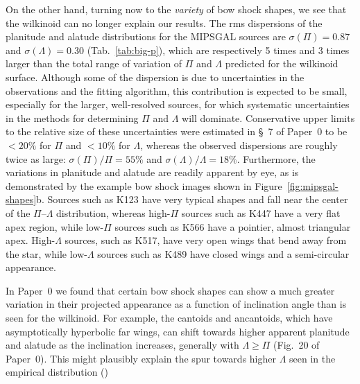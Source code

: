 On the other hand, turning now to the \emph{variety} of bow shock
shapes, we see that the wilkinoid can no longer explain our results.
The rms dispersions of the planitude and alatude distributions for the
MIPSGAL sources are \(\sigma(\Pi) = 0.87\) and
\(\sigma(\Lambda) = 0.30\) (Tab.~\ref{tab:big-p}), which are respectively 5 times
and 3 times larger than the total range of variation of \(\Pi\) and
\(\Lambda\) predicted for the wilkinoid surface.  Although some of the
dispersion is due to uncertainties in the observations and the fitting
algorithm, this contribution is expected to be small, especially for
the larger, well-resolved sources, for which systematic uncertainties
in the methods for determining \(\Pi\) and \(\Lambda\) will
dominate. Conservative upper limits to the relative size of these
uncertainties were estimated in \S~7 of Paper~0 to be \(< 20\%\) for
\(\Pi\) and \(< 10\%\) for \(\Lambda\), whereas the observed dispersions are
roughly twice as large: \(\sigma(\Pi)/\Pi = 55\%\) and
\(\sigma(\Lambda)/\Lambda = 18\%\).  Furthermore, the variations in planitude and
alatude are readily apparent by eye, as is demonstrated by the example
bow shock images shown in Figure~\ref{fig:mipsgal-shapes}b.  Sources
such as K123 have very typical shapes and fall near the center of the
\(\Pi\)--\(\Lambda\) distribution, whereas high-\(\Pi\) sources such as K447 have
a very flat apex region, while low-\(\Pi\) sources such as K566 have a
pointier, almost triangular apex.  High-\(\Lambda\) sources, such as K517,
have very open wings that bend away from the star, while
low-\(\Lambda\) sources such as K489 have closed wings and a semi-circular
appearance.

In Paper~0 we found that certain bow shock shapes can show a much
greater variation in their projected appearance as a function of
inclination angle than is seen for the wilkinoid.  For example, the
cantoids and ancantoids, which have asymptotically hyperbolic far
wings, can shift towards higher apparent planitude and alatude as the
inclination increases, generally with \(\Lambda \ge \Pi\) (Fig.~20 of Paper~0).
This might plausibly explain the spur towards higher \(\Lambda\) seen in the
empirical distribution ()



